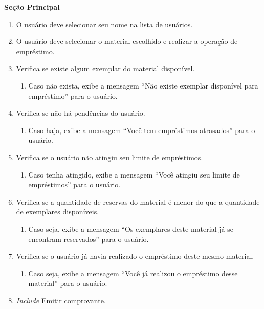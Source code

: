 \documentclass[12pt, a4paper]{article}
\newcommand{\tit}[1]{\textit{#1}}
\newcommand{\tb}[1]{\textbf{#1}}
\newcommand{\quotes}[1]{``#1''}
\begin{document}
\begin{enumerate}[label=\textbf{\arabic*.}]
{{{                    \tb{Seção Principal}
                     \begin{enumerate}[label={\arabic*.}]
                         \item O usuário deve selecionar seu nome na lista de usuários.
                         \item O usuário deve selecionar o material escolhido e realizar a operação de empréstimo.
                         \item Verifica se existe algum exemplar do material disponível.
                         \begin{enumerate}[label={\alph*.}]
                             \item Caso não exista, exibe a mensagem \quotes{Não existe exemplar disponível para empréstimo} para o usuário.
                         \end{enumerate}
                         \item Verifica se não há pendências do usuário.
                         \begin{enumerate}[label={\alph*.}]
                             \item Caso haja, exibe a mensagem \quotes{Você tem empréstimos atrasados} para o usuário.
                         \end{enumerate}
                         \item Verifica se o usuário não atingiu seu limite de empréstimos.
                         \begin{enumerate}[label={\alph*.}]
                             \item Caso tenha atingido, exibe a mensagem \quotes{Você atingiu seu limite de empréstimos} para o usuário.
                         \end{enumerate}
                         \item Verifica se a quantidade de reservas do material é menor do que a quantidade de exemplares disponíveis.
                         \begin{enumerate}[label={\alph*.}]
                             \item Caso seja, exibe a mensagem \quotes{Os exemplares deste material já se encontram reservados} para o usuário.
                         \end{enumerate}
                         \item Verifica se o usuário já havia realizado o empréstimo deste mesmo material.
                         \begin{enumerate}[label={\alph*.}]
                             \item Caso seja, exibe a mensagem \quotes{Você já realizou o empréstimo desse material} para o usuário.
                         \end{enumerate}
                         \item \tit{Include} Emitir comprovante.
                     \end{enumerate} \\
                     
}}}
\end{enumerate}
\end{document}
